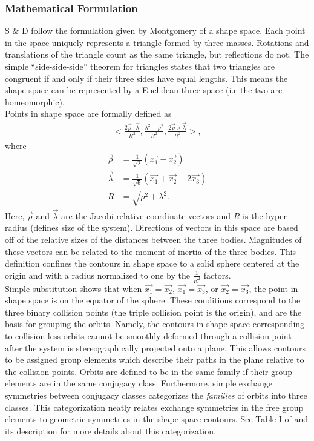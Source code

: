 \documentclass[12pt]{article}
\begin{document}
\subsubsection{Mathematical Formulation}

S \& D follow the formulation given by Montgomery \cite{mont} of a shape space. Each point in the space uniquely represents a triangle formed by three masses. Rotations and translations of the triangle count as the same triangle, but reflections do not. The simple ``side-side-side'' theorem for triangles states that two triangles are congruent if and only if their three sides have equal lengths. This means the shape space can be represented by a Euclidean three-space (i.e the two are homeomorphic). \\

Points in shape space are formally defined as
\begin{align*}
<\frac{2\vec{\rho} \cdot \vec{\lambda}}{R^2},
 \frac{\lambda^2 - \rho^2}{R^2},
 \frac{2\vec{\rho} \times \vec{\lambda}}{R^2}>,
\end{align*}
where
\begin{align*}
\vec{\rho} &= \frac{1}{\sqrt{2}}\left(\vec{x_1} - \vec{x_2} \right) \\
\vec{\lambda} &= \frac{1}{\sqrt{6}}\left(\vec{x_1} + \vec{x_2} - 2\vec{x_3}\right)\\
R &= \sqrt{\rho^2 + \lambda^2}.
\end{align*}
Here, $\vec{\rho}$ and $\vec{\lambda}$ are the Jacobi relative coordinate vectors and $R$ is the hyper-radius (defines size of the system). Directions of vectors in this space are based off of the relative sizes of the distances between the three bodies. Magnitudes of these vectors can be related to the moment of inertia of the three bodies. This definition confines the contours in shape space to a solid sphere centered at the origin and with a radius normalized to one by the $\frac{1}{R^2}$ factors. \\

Simple substitution shows that when $\vec{x_1} = \vec{x_2}$, $\vec{x_1} = \vec{x_3}$, or $\vec{x_2} = \vec{x_3}$, the point in shape space is on the equator of the sphere. These conditions correspond to the three binary collision points (the triple collision point is the origin), and are the basis for grouping the orbits. Namely, the contours in shape space corresponding to collision-less orbits cannot be smoothly deformed through a collision point after the system is stereographically projected onto a plane. This allows contours to be assigned group elements which describe their paths in the plane relative to the collision points. Orbits are defined to be in the same family if their group elements are in the same conjugacy class. Furthermore, simple exchange symmetries between conjugacy classes categorizes the \emph{families} of orbits into three classes. This categorization neatly relates exchange symmetries in the free group elements to geometric symmetries in the shape space contours. See Table I of \cite{suv} and its description for more details about this categorization.
\end{document}
